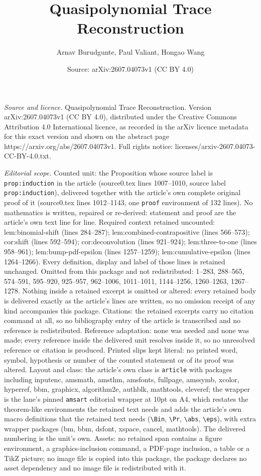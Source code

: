\documentclass[10pt,a4paper]{amsart}
\title[Quasipolynomial Trace Reconstruction]{Quasipolynomial Trace Reconstruction}
\author{Arnav Burudgunte, Paul Valiant, Hongao Wang}
\date{Source: arXiv:2607.04073v1 (CC BY 4.0)}
\begin{document}
\maketitle

\noindent\emph{Source and licence.} Quasipolynomial Trace Reconstruction. Version arXiv:2607.04073v1 (CC BY 4.0), distributed under the Creative Commons Attribution 4.0 International licence, as recorded in the arXiv licence metadata for this exact version and shown on the abstract page https://arxiv.org/abs/2607.04073v1. Full rights notice: licenses/arxiv-2607.04073-CC-BY-4.0.txt.\par\smallskip

\noindent\textit{Editorial scope.} Counted unit: the Proposition whose source label is \texttt{prop:induction} in the article (source0.tex lines 1007--1010, source label \texttt{prop:induction}), delivered together with the article's own complete original proof of it (source0.tex lines 1012--1143, one \texttt{proof} environment of 132 lines). No mathematics is written, repaired or re-derived: statement and proof are the article's own text line for line. Required context retained uncounted: lem:binomial-shift (lines 284--287); lem:combined-contrapositive (lines 566--573); cor:shift (lines 592--594); cor:deconvolution (lines 921--924); lem:three-to-one (lines 958--961); lem:bump-pdf-epsilon (lines 1257--1259); lem:cumulative-epsilon (lines 1264--1266). Every definition, display and label of those lines is retained unchanged. Omitted from this package and not redistributed: 1--283, 288--565, 574--591, 595--920, 925--957, 962--1006, 1011--1011, 1144--1256, 1260--1263, 1267--1278. Nothing inside a retained excerpt is omitted or altered: every retained body is delivered exactly as the article's lines are written, so no omission receipt of any kind accompanies this package. Citations: the retained excerpts carry no citation command at all, so no bibliography entry of the article is transcribed and no reference is redistributed. Reference adaptation: none was needed and none was made; every reference inside the delivered unit resolves inside it, so no unresolved reference or citation is produced. Printed slips kept literal: no printed word, symbol, hypothesis or number of the counted statement or of its proof was altered. Layout and class: the article's own class is \texttt{article} with packages including inputenc, amsmath, amsthm, amsfonts, fullpage, amssymb, xcolor, hyperref, bbm, graphicx, algorithm2e, authblk, mathtools, cleveref; the wrapper is the lane's pinned \texttt{amsart} editorial wrapper at 10pt on A4, which restates the theorem-like environments the retained text needs and adds the article's own macro definitions that the retained text needs (\texttt{\textbackslash Bin}, \texttt{\textbackslash Pr}, \texttt{\textbackslash abs}, \texttt{\textbackslash eps}), with extra wrapper packages (bm, bbm, dsfont, xspace, cancel, mathtools). The delivered numbering is the unit's own. Assets: no retained span contains a figure environment, a graphics-inclusion command, a PDF-page inclusion, a table or a TikZ picture; no image file is copied into this package, the package declares no asset dependency and no image file is redistributed with it. 
\end{document}
